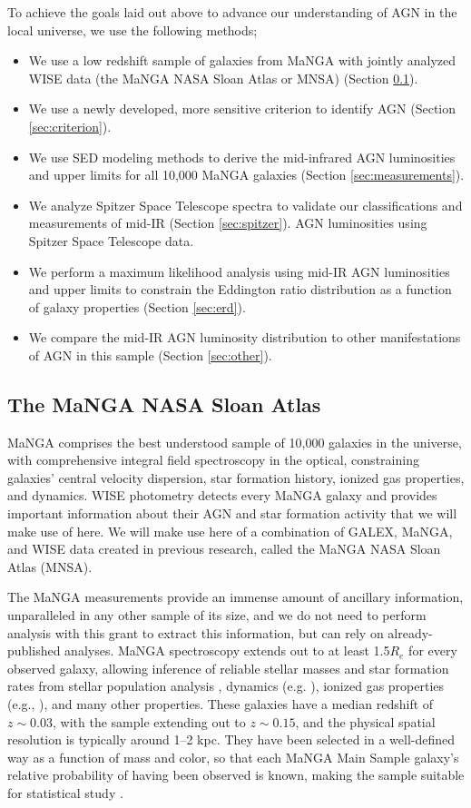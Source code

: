 \documentclass[12pt, preprint]{hacked-aastex}
\begin{document}
To achieve the goals laid out above to advance our understanding 
of AGN in the local universe, we use the following methods;
\begin{itemize}
    \item We use a low redshift sample of galaxies from MaNGA with 
    jointly analyzed WISE data (the MaNGA NASA Sloan Atlas or MNSA)
    (Section \ref{sec:mnsa}).
    \item We use a newly developed, more sensitive criterion to 
    identify AGN  (Section \ref{sec:criterion}).
    \item We use SED modeling methods to derive the mid-infrared AGN 
    luminosities and upper limits for all 10,000 MaNGA galaxies
    (Section \ref{sec:measurements}). 
    \item We analyze Spitzer Space Telescope spectra to validate our 
    classifications and measurements of mid-IR (Section
    \ref{sec:spitzer}).
    AGN luminosities using Spitzer Space Telescope data. 
    \item We perform a maximum likelihood analysis using mid-IR AGN luminosities 
     and upper limits to constrain the Eddington ratio  distribution as a 
     function of galaxy properties (Section \ref{sec:erd}).
    \item We compare the mid-IR AGN luminosity distribution to other manifestations 
    of AGN in this sample (Section \ref{sec:other}).
\end{itemize}

\subsection{The MaNGA NASA Sloan Atlas}
\label{sec:mnsa}

MaNGA comprises the best understood sample of 10,000 galaxies in the universe, 
with comprehensive integral field spectroscopy in the  optical, constraining 
galaxies' central velocity dispersion, star formation history, ionized gas properties,
and dynamics. WISE photometry detects every MaNGA galaxy and provides important 
information about their AGN and star formation activity that we will make use of
here. We will make use here of a combination of GALEX, MaNGA, and WISE 
data created in previous research, called the MaNGA NASA Sloan Atlas (MNSA).

The MaNGA measurements provide an immense amount of ancillary
information, unparalleled in any other sample of its size, and we do
not need to perform analysis with this grant to extract this
information, but can rely on already-published analyses.  MaNGA
spectroscopy extends out to at least 1.5$R_e$ for every observed
galaxy, allowing inference of reliable stellar masses and star
formation rates from stellar population analysis \cite{sanchez22a},
dynamics (e.g. \cite{graham18a}), ionized gas properties (e.g.,
\cite{belfiore17a}), and many other properties.  These galaxies have a
median redshift of $z\sim0.03$, with the sample extending out to
$z\sim 0.15$, and the physical spatial resolution is typically around
1--2 kpc. They have been selected in a well-defined way as a function
of mass and color, so that each MaNGA Main Sample galaxy's relative
probability of having been observed is known, making the sample
suitable for statistical study \cite{wake17a}.
\end{document}
